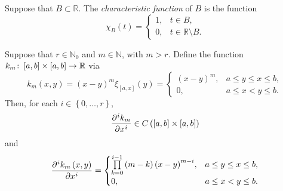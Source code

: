 \begin{frame}
    \begin{definition}
        Suppose that $B\subset\mathbb{R}$.
        The \emph{characteristic function} of $B$ is the function
        \begin{equation*}
            \chi_{B}\left(t\right)=
            \begin{cases}
                1, & t\in B,                    \\
                0, & t\in\mathbb{R}\setminus B.
            \end{cases}
        \end{equation*}
    \end{definition}
\end{frame}

\begin{frame}
    \begin{theorem}[kernel]
        Suppose that $r\in\mathbb{N}_{0}$ and $m\in\mathbb{N}$, with
        $m>r$.
        Define the function
        \begin{math}
            k_{m}\colon
            \left[a,b\right]\times\left[a,b\right]\to
            \mathbb{R}
        \end{math}
        via
        \begin{equation*}
            k_{m}\left(x,y\right)=
                {\left(x-y\right)}^{m}
            \xi_{\left[a,x\right]}\left(y\right)=
            \begin{cases}
                \left(x-y\right)^{m}, & a\leq y\leq x\leq b, \\
                0,                    & a\leq x< y\leq b.
            \end{cases}
        \end{equation*}
        Then, for each $i\in\left\{0,\dotsc,r\right\}$,
        \begin{equation*}
            \diffp[i]{k_{m}}{x}\in
            C\left(\interval\times\interval\right)
        \end{equation*}
        and
        \begin{equation*}
            \diffp[i]{k_{m}\left(x,y\right)}{x}=
            \begin{cases}
                \prod\limits_{k=0}^{i-1}
                \left(m-k\right)
                {\left(x-y\right)}^{m-i}, & a\leq y\leq x\leq b, \\
                0,                        & a\leq x< y\leq b.
            \end{cases}
        \end{equation*}
    \end{theorem}
\end{frame}

